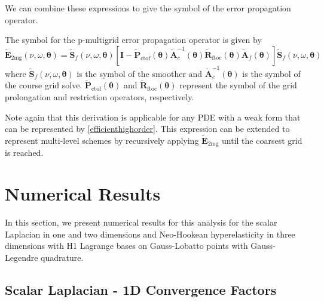 \documentclass[review]{siamart190516}
\begin{document}
We can combine these expressions to give the symbol of the error propagation operator.

\begin{definition}
The symbol for the p-multigrid error propagation operator is given by
\begin{equation}
\tilde{\mathbf{E}}_{\text{2mg}} \left( \nu, \omega, \boldsymbol{\theta} \right) = \tilde{\mathbf{S}}_f \left( \nu, \omega, \boldsymbol{\theta} \right) \left[ \mathbf{I} - \tilde{\mathbf{P}}_{\text{ctof}} \left( \boldsymbol{\theta} \right) \tilde{\mathbf{A}}_c^{-1} \left( \boldsymbol{\theta} \right) \tilde{\mathbf{R}}_{\text{ftoc}} \left( \boldsymbol{\theta} \right) \tilde{\mathbf{A}}_f \left( \boldsymbol{\theta} \right) \right] \tilde{\mathbf{S}}_f \left( \nu, \omega, \boldsymbol{\theta} \right)
\end{equation}
where $\tilde{\mathbf{S}}_f \left( \nu, \omega, \boldsymbol{\theta} \right)$ is the symbol of the smoother and $\tilde{\mathbf{A}}_c^{-1} \left( \boldsymbol{\theta} \right)$ is the symbol of the course grid solve.
$\tilde{\mathbf{P}}_{\text{ctof}} \left( \boldsymbol{\theta} \right)$ and $\tilde{\mathbf{R}}_{\text{ftoc}} \left( \boldsymbol{\theta} \right)$ represent the symbol of the grid prolongation and restriction operators, respectively. 
\end{definition}\label{def:pmultigrid_symbol}

Note again that this derivation is applicable for any PDE with a weak form that can be represented by \cref{efficienthighorder}.
This expression can be extended to represent multi-level schemes by recursively applying $\tilde{\mathbf{E}}_{\text{2mg}}$ until the coarsest grid is reached.

\section{Numerical Results}\label{sec:results}

In this section, we present numerical results for this analysis for the scalar Laplacian in one and two dimensions and Neo-Hookean hyperelasticity in three dimensions with H1 Lagrange bases on Gauss-Lobatto points with Gauss-Legendre quadrature.

\subsection{Scalar Laplacian - 1D Convergence Factors}\label{sec:1dresults}
\end{document}
